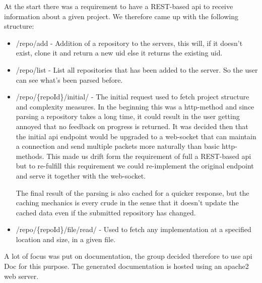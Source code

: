 At the start there was a requirement to have a REST-based \gls{api} to receive information about a given project. We therefore came up with the following structure:
\begin{itemize}
    \item /repo/add - Addition of a repository to the servers, this will, if it doesn't exist, clone it and return a new \gls{uid} else it returns the existing \gls{uid}.
    \item /repo/list - List all repositories that has been added to the server. So the user can see what's been parsed before.
    \item /repo/\{repoId\}/initial/ - The initial request used to fetch project structure and complexity measures. In the beginning this was a \gls{http}-method and since parsing a repository takes a long time, it could result in the user getting annoyed that no feedback on progress is returned. It was decided then that the initial \gls{api} endpoint would be upgraded to a web-socket that can maintain a connection and send multiple packets more naturally than basic \gls{http}-methods. This made us drift form the requirement of full a REST-based \gls{api} but to re-fulfill this requirement we could re-implement the original endpoint and serve it together with the web-socket.  
    
    The final result of the parsing is also cached for a quicker response, but the caching mechanics is every crude in the sense that it doesn't update the cached data even if the submitted repository has changed.
    \item /repo/\{repoId\}/file/read/ - Used to fetch any implementation at a specified location and size, in a given file.
\end{itemize}

A lot of focus was put on documentation, the group decided therefore to use \gls{api} Doc for this purpose. The generated documentation is hosted using an \Gls{apache2} web server. 